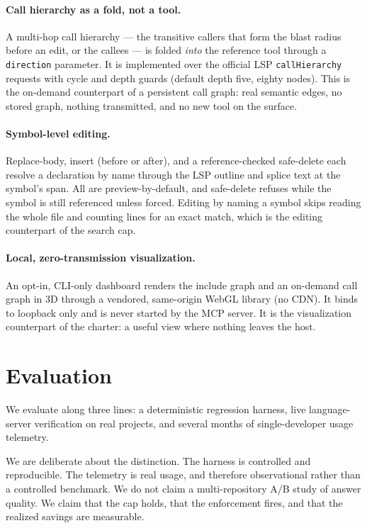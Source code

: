 \documentclass[11pt]{article}
\begin{document}
\paragraph{Call hierarchy as a fold, not a tool.}
A multi-hop call hierarchy --- the transitive callers that form the blast radius
before an edit, or the callees --- is folded \emph{into} the reference tool through
a \texttt{direction} parameter. It is implemented over the official LSP
\texttt{callHierarchy} requests with cycle and depth guards (default depth five,
eighty nodes). This is the on-demand counterpart of a persistent call graph: real
semantic edges, no stored graph, nothing transmitted, and no new tool on the
surface.

\paragraph{Symbol-level editing.}
Replace-body, insert (before or after), and a reference-checked safe-delete each
resolve a declaration by name through the LSP outline and splice text at the
symbol's span. All are preview-by-default, and safe-delete refuses while the symbol
is still referenced unless forced. Editing by naming a symbol skips reading the
whole file and counting lines for an exact match, which is the editing counterpart
of the search cap.

\paragraph{Local, zero-transmission visualization.}
An opt-in, CLI-only dashboard renders the include graph and an on-demand call graph
in 3D through a vendored, same-origin WebGL library (no CDN). It binds to loopback
only and is never started by the MCP server. It is the visualization counterpart of
the charter: a useful view where nothing leaves the host.

\section{Evaluation}
\label{sec:eval}

We evaluate along three lines: a deterministic regression harness, live
language-server verification on real projects, and several months of
single-developer usage telemetry.

We are deliberate about the distinction. The harness is controlled and
reproducible. The telemetry is real usage, and therefore observational rather than a
controlled benchmark. We do not claim a multi-repository A/B study of answer
quality. We claim that the cap holds, that the enforcement fires, and that the
realized savings are measurable.
\end{document}
